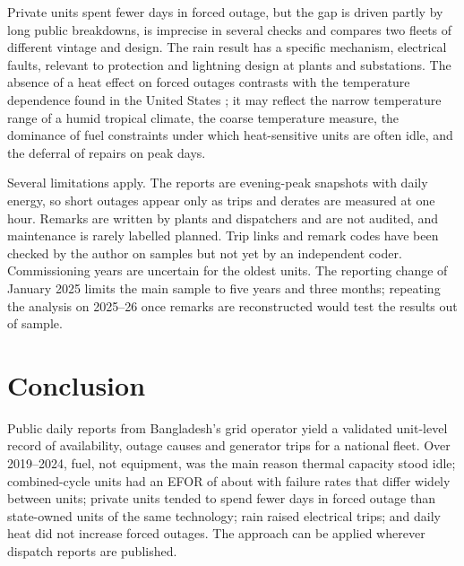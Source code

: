 \documentclass[11pt]{article}
\begin{document}
Private units spent fewer days in forced outage, but the gap is driven partly by long public breakdowns, is imprecise in several checks and compares two fleets of different vintage and design. The rain result has a specific mechanism, electrical faults, relevant to protection and lightning design at plants and substations. The absence of a heat effect on forced outages contrasts with the temperature dependence found in the United States \citep{murphy2019timedependent}; it may reflect the narrow temperature range of a humid tropical climate, the coarse temperature measure, the dominance of fuel constraints under which heat-sensitive units are often idle, and the deferral of repairs on peak days.

Several limitations apply. The reports are evening-peak snapshots with daily energy, so short outages appear only as trips and derates are measured at one hour. Remarks are written by plants and dispatchers and are not audited, and maintenance is rarely labelled planned. Trip links and remark codes have been checked by the author on samples but not yet by an independent coder. Commissioning years are uncertain for the oldest units. The reporting change of January 2025 limits the main sample to five years and three months; repeating the analysis on 2025--26 once remarks are reconstructed would test the results out of sample.

\section{Conclusion}

Public daily reports from Bangladesh's grid operator yield a validated unit-level record of availability, outage causes and generator trips for a national fleet. Over 2019--2024, fuel, not equipment, was the main reason thermal capacity stood idle; combined-cycle units had an EFOR of about \ieeeCcEFOR{} with failure rates that differ widely between units; private units tended to spend fewer days in forced outage than state-owned units of the same technology; rain raised electrical trips; and daily heat did not increase forced outages. The approach can be applied wherever dispatch reports are published.



\end{document}
